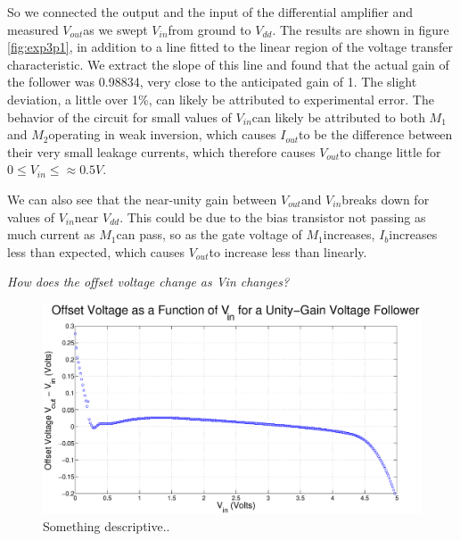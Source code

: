 \documentclass{article}
\newcommand{\Vdd}{{$V_{dd}$}}
\newcommand{\Iout}{{$I_{out}$}}
\newcommand{\Vout}{{$V_{out}$}}
\newcommand{\Vin}{{$V_{in}$}}
\newcommand{\Ib}{{$I_{b}$}}
\newcommand{\Mone}{{$M_{1}$}}
\newcommand{\Mtwo}{{$M_{2}$}}
\begin{document}
So we connected the output and the input of the differential amplifier and measured \Vout as we swept \Vin from ground to \Vdd. The results are shown in figure \ref{fig:exp3p1}, in addition to a line fitted to the linear region of the voltage transfer characteristic. We extract the slope of this line and found that the actual gain of the follower was 0.98834, very close to the anticipated gain of 1. The slight deviation, a little over 1\%, can likely be attributed to experimental error. The behavior of the circuit for small values of \Vin can likely be attributed to both \Mone and \Mtwo operating in weak inversion, which causes \Iout to be the difference between their very small leakage currents, which therefore causes \Vout to change little for $0 \leq V_{in} \leq \approx 0.5 V.$

We can also see that the near-unity gain between \Vout and \Vin breaks down for values of \Vin near \Vdd. This could be due to the bias transistor not passing as much current as \Mone can pass, so as the gate voltage of \Mone increases, \Ib increases less than expected, which causes \Vout to increase less than linearly.

\textit{How does the offset voltage change as Vin changes?}
\begin{figure}[H]
\centering
\includegraphics[width=\linewidth]{../Figures/Exp3P2.eps}
\caption{Something descriptive..}
\label{fig:exp3p2}
\end{figure}
\end{document}
